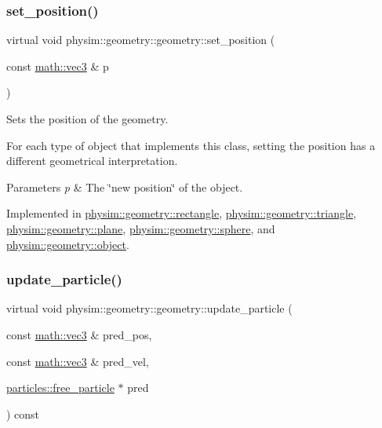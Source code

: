 \subsubsection{\texorpdfstring{set\+\_\+position()}{set\_position()}}
{\footnotesize\ttfamily virtual void physim\+::geometry\+::geometry\+::set\+\_\+position (\begin{DoxyParamCaption}\item[{const \hyperlink{structphysim_1_1math_1_1vec3}{math\+::vec3} \&}]{p }\end{DoxyParamCaption})\hspace{0.3cm}{\ttfamily [pure virtual]}}



Sets the position of the geometry. 

For each type of object that implements this class, setting the position has a different geometrical interpretation. 
\begin{DoxyParams}{Parameters}
{\em p} & The \char`\"{}new position\char`\"{} of the object. \\
\hline
\end{DoxyParams}


Implemented in \hyperlink{classphysim_1_1geometry_1_1rectangle_acb53f7b6b466f152087847bc8527245a}{physim\+::geometry\+::rectangle}, \hyperlink{classphysim_1_1geometry_1_1triangle_a9446670dcea26f020c4ad10c7234cce6}{physim\+::geometry\+::triangle}, \hyperlink{classphysim_1_1geometry_1_1plane_a9de66b1c50ea9d34a8142e0a48751692}{physim\+::geometry\+::plane}, \hyperlink{classphysim_1_1geometry_1_1sphere_a85a3364712fdd23409dcf2cb2e574d09}{physim\+::geometry\+::sphere}, and \hyperlink{classphysim_1_1geometry_1_1object_a45f72ec911732fc475c9264386626cfe}{physim\+::geometry\+::object}.

\mbox{\label{classphysim_1_1geometry_1_1geometry_abbf5d7e5e0214d3c2cf95064f552928d}} 
\subsubsection{\texorpdfstring{update\+\_\+particle()}{update\_particle()}\hspace{0.1cm}{\footnotesize\ttfamily [1/2]}}
{\footnotesize\ttfamily virtual void physim\+::geometry\+::geometry\+::update\+\_\+particle (\begin{DoxyParamCaption}\item[{const \hyperlink{structphysim_1_1math_1_1vec3}{math\+::vec3} \&}]{pred\+\_\+pos,  }\item[{const \hyperlink{structphysim_1_1math_1_1vec3}{math\+::vec3} \&}]{pred\+\_\+vel,  }\item[{\hyperlink{classphysim_1_1particles_1_1free__particle}{particles\+::free\+\_\+particle} $\ast$}]{pred }\end{DoxyParamCaption}) const\hspace{0.3cm}{\ttfamily [pure virtual]}}



